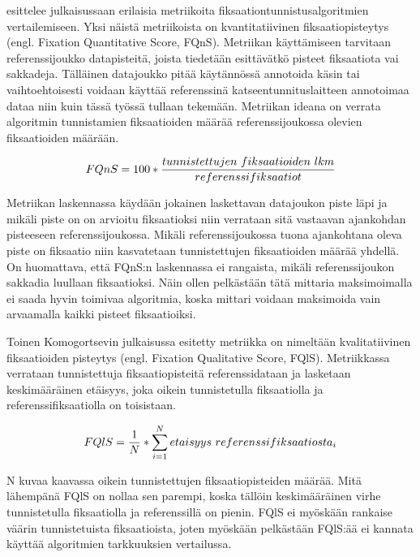 \citet[s. 4]{komogortsev2010} esittelee julkaisussaan erilaisia metriikoita fiksaationtunnistusalgoritmien vertailemiseen. Yksi näistä metriikoista on kvantitatiivinen fiksaatiopisteytys (engl. Fixation Quantitative Score, FQnS). Metriikan käyttämiseen tarvitaan referenssijoukko datapisteitä, joista tiedetään esittävätkö pisteet fiksaatiota vai sakkadeja. Tälläinen datajoukko pitää käytännössä annotoida käsin tai vaihtoehtoisesti voidaan käyttää referenssinä katseentunnituslaitteen annotoimaa dataa niin kuin tässä työssä tullaan tekemään. Metriikan ideana on verrata algoritmin tunnistamien fiksaatioiden määrää referenssijoukossa olevien fiksaatioiden määrään.

\[
FQnS = 100 * {{tunnistettujen\ fiksaatioiden\ lkm} \over {referenssifiksaatiot}}
\]
 
 Metriikan laskennassa käydään jokainen laskettavan datajoukon piste läpi ja mikäli piste on on arvioitu fiksaatioksi niin verrataan sitä vastaavan ajankohdan pisteeseen referenssijoukossa. Mikäli referenssijoukossa tuona ajankohtana oleva piste on fiksaatio niin kasvatetaan tunnistettujen fiksaatioiden määrää yhdellä. On huomattava, että FQnS:n laskennassa ei rangaista, mikäli referenssijoukon sakkadia luullaan fiksaatioksi. Näin ollen pelkästään tätä mittaria maksimoimalla ei saada hyvin toimivaa algoritmia, koska mittari voidaan maksimoida vain arvaamalla kaikki pisteet fiksaatioiksi.
 
 Toinen Komogortsevin julkaisussa esitetty metriikka on nimeltään kvalitatiivinen fiksaatioiden pisteytys (engl. Fixation Qualitative Score, FQlS). Metriikkassa verrataan tunnistettuja fiksaatiopisteitä referenssidataan ja lasketaan keskimääräinen etäisyys, joka oikein tunnistetulla fiksaatiolla ja referenssifiksaatiolla on toisistaan. 

\[
FQlS = {1 \over N} * \sum\limits_{i=1}^N etaisyys\ referenssifiksaatiosta_i
\]

N kuvaa kaavassa oikein tunnistettujen fiksaatiopisteiden määrää. Mitä lähempänä FQlS on nollaa sen parempi, koska tällöin keskimääräinen virhe tunnistetulla fiksaatiolla ja referenssillä on pienin. FQlS ei myöskään rankaise väärin tunnistetuista fiksaatioista, joten myöskään pelkästään FQlS:ää ei kannata käyttää algoritmien tarkkuuksien vertailussa.

